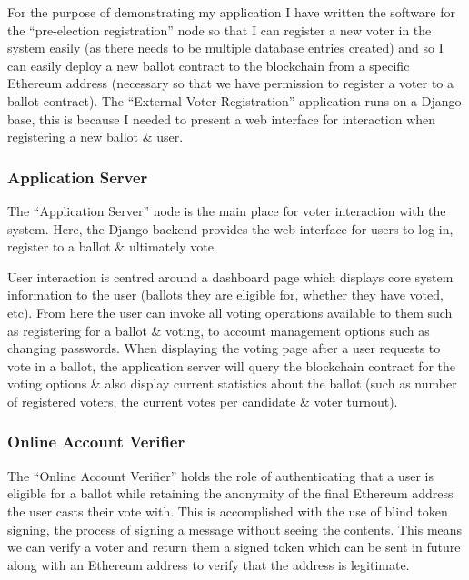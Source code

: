 \documentclass{article}
\begin{document}
For the purpose of demonstrating my application I have written the software for the ``pre-election registration'' node so that I can register a new voter in the system easily (as there needs to be multiple database entries created) and so I can easily deploy a new ballot contract to the blockchain from a specific Ethereum address (necessary so that we have permission to register a voter to a ballot contract). The ``External Voter Registration'' application runs on a Django base, this is because I needed to present a web interface for interaction when registering a new ballot \& user.

\subsubsection{Application Server}
The ``Application Server'' node is the main place for voter interaction with the system. Here, the Django backend provides the web interface for users to log in, register to a ballot \& ultimately vote.

User interaction is centred around a dashboard page which displays core system information to the user (ballots they are eligible for, whether they have voted, etc). From here the user can invoke all voting operations available to them such as registering for a ballot \& voting, to account management options such as changing passwords. When displaying the voting page after a user requests to vote in a ballot, the application server will query the blockchain contract for the voting options \& also display current statistics about the ballot (such as number of registered voters, the current votes per candidate \& voter turnout).

\subsubsection{Online Account Verifier}
The ``Online Account Verifier'' holds the role of authenticating that a user is eligible for a ballot while retaining the anonymity of the final Ethereum address the user casts their vote with. This is accomplished with the use of blind token signing, the process of signing a message without seeing the contents. This means we can verify a voter and return them a signed token which can be sent in future along with an Ethereum address to verify that the address is legitimate. 
\end{document}
